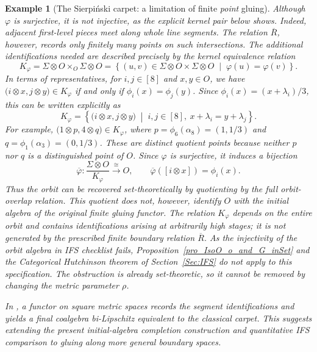 \documentclass{sn-jnl}%
\theoremstyle{thmstyleone}%
\theoremstyle{thmstyletwo}%
\newtheorem{example}{Example}%
\theoremstyle{thmstylethree}%
\newcommand{\M}{\Sigma}
\newcommand{\F}{\M\otimes}
\newcommand{\f}{\phi}
\begin{document}
\begin{example}[The Sierpiński carpet: a limitation of finite \textit{point} gluing]
    Although $\varphi$ is surjective, it is not injective, as the explicit kernel pair below shows.  Indeed, adjacent first-level pieces meet along whole line segments. The relation $\overline R$, however, records only finitely many points on such intersections. The additional identifications needed are described precisely by the kernel equivalence relation
    \begin{equation} 
    \nonumber
       K_\varphi = \F O\times_O\F O = \left\{ (u,v)\in\F O\times\F O \;\middle|\;      \varphi(u)=\varphi(v) \right\}.
    \end{equation}
    In terms of representatives, for $i,j\in[8]$ and $x,y\in O$, we have $\bigl(i\otimes x,j\otimes y\bigr)\in K_\varphi$ if and only if $\f_i(x)=\f_j(y)$. Since $\f_i(x)=(x+\lambda_i)/3$, this can be written explicitly as
    \begin{equation} 
    \nonumber
       K_\varphi = \left\{ \bigl(i\otimes x,j\otimes y\bigr) \;\middle|\; i,j\in[8],\ x+\lambda_i=y+\lambda_j \right\}.
    \end{equation}
    For example, $\bigl(1\otimes p,4\otimes q\bigr)\in K_\varphi$, where $p=\f_6(\alpha_8)=(1,1/3)$ and $q=\f_1(\alpha_3)=(0,1/3)$. These are distinct quotient points because neither $p$ nor $q$ is a distinguished point of $O$. Since $\varphi$ is surjective, it induces a bijection
    \begin{equation} 
    \nonumber
       \overline\varphi: \frac{\F O}{K_\varphi} \xrightarrow{\ \cong\ } O, \qquad    \overline\varphi([i\otimes x])=\f_i(x).
    \end{equation}
    Thus the orbit can be recovered set-theoretically by quotienting by the full orbit-overlap relation. This quotient does not, however, identify $O$ with the initial algebra of the original finite gluing functor.  The relation $K_\varphi$ depends on the entire orbit and contains identifications arising at arbitrarily high stages; it is not generated by the prescribed finite boundary relation $\overline R$.  As the injectivity of the orbit algebra in IFS checklist fails, Proposition~\ref{pro_IsoO_o_and_G_inSet} and the Categorical Hutchinson theorem of Section~\ref{Sec:IFS} \textit{do not apply} to this specification.  The obstruction is already set-theoretic, so it cannot be removed by changing the metric parameter $\rho$.

    In \cite{Sierpinsky_carpet}, a functor on square metric spaces records the segment identifications and yields a final coalgebra bi-Lipschitz equivalent to the classical carpet. This suggests extending the present initial-algebra completion construction and quantitative IFS comparison to gluing along more general boundary spaces.
\end{example}
\end{document}
